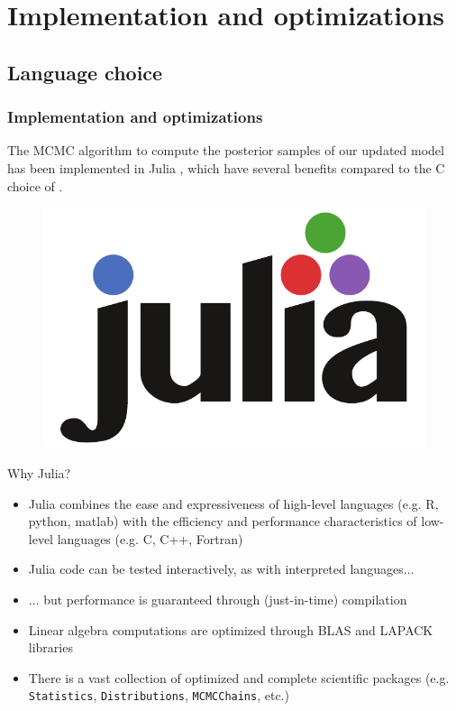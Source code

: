 \documentclass[
	11pt, %
 xcolor={dvipsnames,svgnames}
]{beamer}
\let\cite\citep
\newcommand{\mjline}[1]{\texttt{#1}}
\begin{document}


\section{Implementation and optimizations}

\subsection{Language choice}
\begin{frame}
\frametitle{Implementation and optimizations}

The MCMC algorithm to compute the posterior samples of our updated model has been implemented in Julia \cite{Julia-cite}, which have several benefits compared to the C choice of \citet{1-drpm}.

\begin{figure}
    \centering
    \includegraphics[width=0.6\linewidth]{imgs/julia-logo-color-pdfx3.pdf}
\end{figure}
\end{frame}

\begin{frame}{Why Julia?}

\begin{itemize}
    \item Julia combines the ease and expressiveness of high-level languages (e.g. R, python, matlab) with the efficiency and performance characteristics of low-level languages (e.g. C, C++, Fortran)
    \item Julia code can be tested interactively, as with interpreted languages$\ldots$
    \item $\ldots$ but performance is guaranteed through (just-in-time) compilation
    \item Linear algebra computations are optimized through BLAS and LAPACK libraries
    \item There is a vast collection of optimized and complete scientific packages (e.g. \mjline{Statistics}, \mjline{Distributions}, \mjline{MCMCChains}, etc.)
\end{itemize}
\end{frame}
\end{document}
